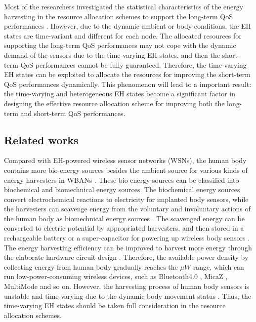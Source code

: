 \documentclass[journal,10pt]{IEEEtran}
\begin{document}
Most of the researchers investigated the statistical characteristics of the energy harvesting in the resource allocation schemes to support the long-term QoS performances \cite{ibarra2016qos,ozel2011transmission,leng2017resource}. 
However, due to the dynamic ambient or body conditions, the EH states are time-variant and different for each node.
The allocated resources for supporting the long-term QoS performances may not cope with the dynamic demand of the sensors due to the time-varying EH states, and then the short-term QoS performances cannot be fully guaranteed.
Therefore, the time-varying EH states can be exploited to allocate the resources for improving the short-term QoS performances dynamically. This phenomenon will lead to a important result: the time-varying and heterogeneous EH states become a significant factor in designing the effective resource allocation scheme for improving both the long-term and short-term QoS performances. 

\subsection{Related works}
Compared with EH-powered wireless sensor networks (WSNs), the human body contains more bio-energy sources besides the ambient source for various kinds of energy harvesters in WBANs \cite{leng2017resource}. These bio-energy sources can be classified into biochemical and biomechnical energy sources. The biochemical energy sources convert electrochemical reactions to electricity for implanted body sensors, while the harvesters can scavenge energy from the voluntary and involuntary actions of the human body as biomechnical energy sources \cite{akhtar2017energy}. The scavenged energy can be converted to electric potential by appropriated harvesters, and then stored in a rechargeable battery or a super-capacitor for powering up wireless body sensors \cite{wahbah2014characterization}. The energy harvesting efficiency can be improved to harvest more energy through the elaborate hardware circuit design \cite{xia20140,el201610}. Therefore, the available power density by collecting energy from human body gradually reaches the $\mu W$ range, which can run low-power-consuming wireless devices, such as Bluetooth4.0 \cite{bluetooth2010}, MicaZ \cite{kramer2006energy}, MultiMode \cite{wong20131} and so on. However, the harvesting process of human body sensors is unstable and time-varying due to the dynamic body movement status \cite{hao2017energy}. Thus, the time-varying EH states should be taken full consideration in the resource allocation schemes.
\end{document}
